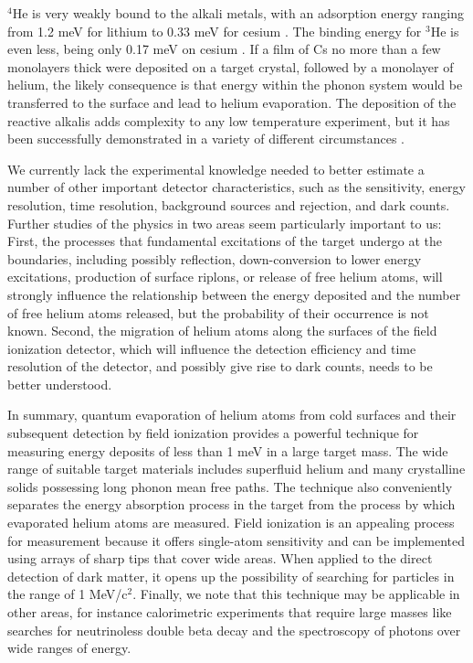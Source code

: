 \documentclass[10pt, letterpaper, reprint, superscriptaddress, aps, prl]
{revtex4-1} \usepackage[latin1]{inputenc}
\begin{document}
$^4$He is very weakly bound to the alkali metals, with an adsorption energy ranging from 1.2 meV for lithium \cite{Van2008} to 0.33 meV for cesium \cite{Rutledge1992,Taborek1992,Gatica2009}. 
The binding energy for $^3$He is even less, being only 0.17 meV on cesium \cite{Ross1995}. 
If a film of Cs no more than a few monolayers thick were deposited on a target crystal, followed by a monolayer of helium, the likely consequence is that energy within the phonon system would be transferred to the surface and lead to helium evaporation. 
The deposition of the reactive alkalis adds complexity to any low temperature experiment, but it has been successfully demonstrated in a variety of different circumstances \cite{Van2008,Ross1995,Nacher1991}.

We currently lack the experimental knowledge needed to better estimate a number of other important detector characteristics, such as the sensitivity, energy resolution, time resolution, background sources and rejection, and dark counts. 
Further studies of the physics in two areas seem particularly important to us: First, the processes that fundamental excitations of the target undergo at the boundaries, including possibly reflection, down-conversion to lower energy excitations, production of surface riplons, or release of free helium atoms, will strongly influence the relationship between the energy deposited and the number of free helium atoms released, but the probability of their occurrence is not known. 
Second, the migration of helium atoms along the surfaces of the field ionization detector, which will influence the detection efficiency and time resolution of the detector, and possibly give rise to dark counts, needs to be better understood.

In summary, quantum evaporation of helium atoms from cold surfaces and their subsequent detection by field ionization provides a powerful technique for measuring energy deposits of less than 1 meV in a large target mass. 
The wide range of suitable target materials includes superfluid helium and many crystalline solids possessing long phonon mean free paths. 
The technique also conveniently separates the energy absorption process in the target from the process by which evaporated helium atoms are measured. 
Field ionization is an appealing process for measurement because it offers single-atom sensitivity and can be implemented using arrays of sharp tips that cover wide areas. 
When applied to the direct detection of dark matter, it opens up the possibility of searching for particles in the range of 1 MeV/c$^2$. 
Finally, we note that this technique may be applicable in other areas, for instance calorimetric experiments that require large masses like searches for neutrinoless double beta decay and the spectroscopy of photons over wide ranges of energy. 
\end{document}
